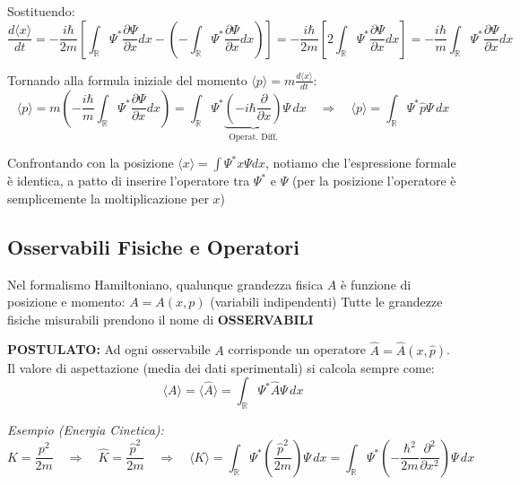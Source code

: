 \documentclass[11pt, a4paper]{article}
\begin{document}
Sostituendo: %
\begin{equation*}
    \frac{d\langle x \rangle}{dt} = -\frac{i\hbar}{2m} \left[ \int_{\mathbb{R}} \Psi^* \frac{\partial \Psi}{\partial x} dx - \left( -\int_{\mathbb{R}} \Psi^* \frac{\partial \Psi}{\partial x} dx \right) \right] = -\frac{i\hbar}{2m} \left[ 2 \int_{\mathbb{R}} \Psi^* \frac{\partial \Psi}{\partial x} dx \right] = -\frac{i\hbar}{m} \int_{\mathbb{R}} \Psi^* \frac{\partial \Psi}{\partial x} dx %
\end{equation*}

Tornando alla formula iniziale del momento $\langle p \rangle = m \frac{d\langle x \rangle}{dt}$: %
\begin{equation}
    \langle p \rangle = m \left( -\frac{i\hbar}{m} \int_{\mathbb{R}} \Psi^* \frac{\partial \Psi}{\partial x} dx \right) = \int_{\mathbb{R}} \Psi^* \underbrace{ \left( -i\hbar \frac{\partial}{\partial x} \right) }_{\text{Operat. Diff.}} \Psi \, dx \quad \Rightarrow \quad \boxed{ \langle p \rangle = \int_{\mathbb{R}} \Psi^* \hat{p} \Psi \, dx } %
\end{equation}

\noindent
Confrontando con la posizione $\langle x \rangle = \int \Psi^* x \Psi dx$, notiamo che l'espressione formale è identica, a patto di inserire l'operatore tra $\Psi^*$ e $\Psi$ (per la posizione l'operatore è semplicemente la moltiplicazione per $x$) %

\subsection{Osservabili Fisiche e Operatori} %

Nel formalismo Hamiltoniano, qualunque grandezza fisica $A$ è funzione di posizione e momento: $A = A(x,p)$ (variabili indipendenti) %
Tutte le grandezze fisiche misurabili prendono il nome di \textbf{OSSERVABILI} %

\noindent
\textbf{POSTULATO:} Ad ogni osservabile $A$ corrisponde un operatore $\hat{A} = \hat{A}(x,\hat{p})$. Il valore di aspettazione (media dei dati sperimentali) si calcola sempre come: %
\begin{equation}
    \boxed{ \langle A \rangle = \langle \hat{A} \rangle = \int_{\mathbb{R}} \Psi^* \hat{A} \Psi \, dx } %
\end{equation}

\textit{Esempio (Energia Cinetica):} %
\begin{equation*}
    K = \frac{p^2}{2m} \quad \Rightarrow \quad \hat{K} = \frac{\hat{p}^2}{2m} \quad \Rightarrow \quad \langle K \rangle = \int_{\mathbb{R}} \Psi^* \left( \frac{\hat{p}^2}{2m} \right) \Psi \, dx = \int_{\mathbb{R}} \Psi^* \left( -\frac{\hbar^2}{2m} \frac{\partial^2}{\partial x^2} \right) \Psi \, dx %
\end{equation*}
\end{document}
